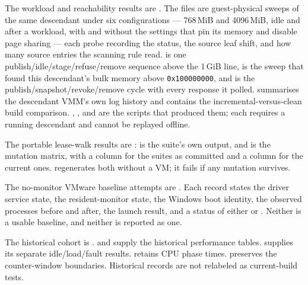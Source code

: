 The workload and reachability results are
. The 
files are guest-physical sweeps of the same descendant under six configurations
--- 768\,MiB and 4096\,MiB, idle and after a workload, with and without the
settings that pin its memory and disable page sharing --- each probe recording
the status, the source leaf shift, and how many source entries the scanning rule
read.  is one publish/idle/stage/refuse/remove
sequence above the 1\,GiB line,  is the sweep that
found this descendant's bulk memory above \texttt{0x100000000}, and
 is the publish/snapshot/revoke/remove cycle with
every response it polled.  summarises the
descendant VMM's own log history and contains the incremental-versus-clean build
comparison. ,
,
 and
 are the scripts that produced them;
each requires a running descendant and cannot be replayed offline.

The portable lease-walk results are
:
 is the suite's own output, and
 is the mutation matrix, with a column
for the suites as committed and a column for the current ones.
 regenerates both without a VM; it
fails if any mutation survives.

The no-monitor VMware baseline attempts are
. Each record states the driver
service state, the resident-monitor state, the Windows boot identity, the
observed  processes before and after, the launch result, and a
status of either  or
. Neither is a usable baseline, and neither is reported as
one.

The historical cohort is .
 and
 supply the historical performance
tables.  supplies its separate idle/load/fault
results.  retains CPU phase
times.  preserves the counter-window
boundaries. Historical records are not relabeled as current-build tests.


